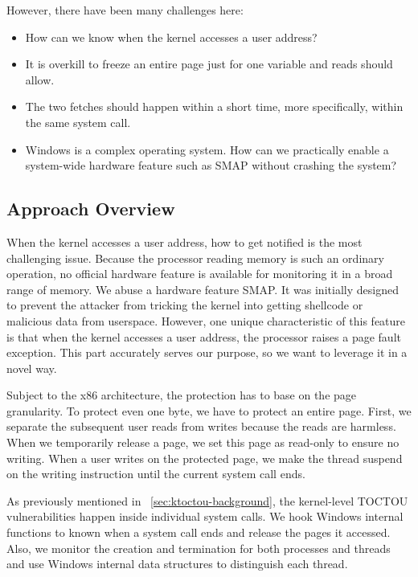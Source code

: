 However, there have been many challenges here:

\begin{itemize}
	\item How can we know when the kernel accesses a user address?
	\item It is overkill to freeze an entire page just for one variable and reads should allow.
	\item The two fetches should happen within a short time, more specifically, within the same system call.
	\item Windows is a complex operating system. How can we practically enable a system-wide hardware feature such as SMAP without crashing the system?
\end{itemize}



\subsection{Approach Overview}


When the kernel accesses a user address, how to get notified is the most challenging issue. Because the processor reading memory is such an ordinary operation, no official hardware feature is available for monitoring it in a broad range of memory. We abuse a hardware feature SMAP. It was initially designed to prevent the attacker from tricking the kernel into getting shellcode or malicious data from userspace. However, one unique characteristic of this feature is that when the kernel accesses a user address, the processor raises a page fault exception. This part accurately serves our purpose, so we want to leverage it in a novel way.

Subject to the x86 architecture, the protection has to base on the page granularity. To protect even one byte, we have to protect an entire page.
First, we separate the subsequent user reads from writes because the reads are harmless.  When we temporarily release a page, we set this page as read-only to ensure no writing. When a user writes on the protected page, we make the thread suspend on the writing instruction until the current system call ends.

As previously mentioned in ~\autoref{sec:ktoctou-background}, the kernel-level TOCTOU vulnerabilities happen inside individual system calls. We hook Windows internal functions to known when a system call ends and release the pages it accessed. Also, we monitor the creation and termination for both processes and threads and use Windows internal data structures to distinguish each thread.

